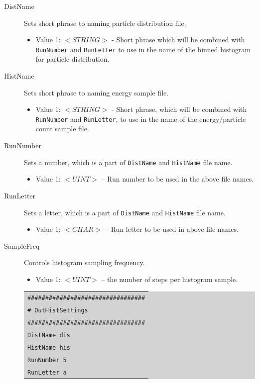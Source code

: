 \begin{description}
\item [DistName] Sets short phrase to naming particle distribution file.
	\begin{itemize}
	\item Value 1: $<STRING>$ - Short phrase which will be combined with \texttt{RunNumber} and \texttt{RunLetter} to use in the name of the binned histogram for particle distribution.
	\end{itemize}
\item [HistName] Sets short phrase to naming energy sample file.
	\begin{itemize}
	\item Value 1: $<STRING>$ - Short phrase, which will be combined with \texttt{RunNumber} and \texttt{RunLetter}, to use in the name of the energy/particle count sample file.
	\end{itemize}
\item [RunNumber] Sets a number, which is a part of \texttt{DistName} and \texttt{HistName} file name.
	\begin{itemize}
	\item Value 1: $<UINT>$ – Run number to be used in the above file names.
	\end{itemize}
\item [RunLetter] Sets a letter, which is a part of \texttt{DistName} and \texttt{HistName} file name.
	\begin{itemize}
	\item Value 1: $<CHAR>$ – Run letter to be used in above file names.
	\end{itemize}
\item [SampleFreq] Controls histogram sampling frequency. 
	\begin{itemize}
	\item Value 1: $<UINT>$ – the number of steps per histogram sample.
	\end{itemize}
	\colorbox{lightgray}{
	\begin{tabular}{l}
	\texttt{\#\#\#\#\#\#\#\#\#\#\#\#\#\#\#\#\#\#\#\#\#\#\#\#\#\#\#\#\#\#\#\#\#}\\
	\texttt{\#  OutHistSettings}\\
	\texttt{\#\#\#\#\#\#\#\#\#\#\#\#\#\#\#\#\#\#\#\#\#\#\#\#\#\#\#\#\#\#\#\#\#}\\
	\texttt{DistName dis}\\
	\texttt{HistName his}\\
	\texttt{RunNumber 5}\\
	\texttt{RunLetter a}\\

\end{tabular}}
\end{description}
